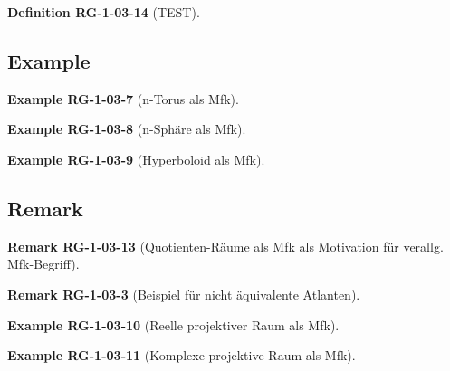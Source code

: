\documentclass[10pt, letterpaper]{article}
\newcommand{\CustomHeading}[3]{%
  \par\medskip\noindent%
  \textbf{#1 #2} \textnormal{(#3)}.\enskip%
}
\newenvironment{DEF}[2]{\CustomHeading{Definition}{#1}{#2}}{}
\newenvironment{REM}[2]{\CustomHeading{Remark}{#1}{#2}}{}
\newenvironment{EXA}[2]{\CustomHeading{Example}{#1}{#2}}{}
\begin{document}
\begin{DEF}{RG-1-03-14}{TEST}

\end{DEF}











\subsection{Example}

\begin{EXA}{RG-1-03-7}{n-Torus als Mfk}

\end{EXA}

\begin{EXA}{RG-1-03-8}{n-Sphäre als Mfk}

\end{EXA}

\begin{EXA}{RG-1-03-9}{Hyperboloid als Mfk}

\end{EXA}







\subsection{Remark}



\begin{REM}{RG-1-03-13}{Quotienten-Räume als Mfk als Motivation für verallg. Mfk-Begriff}

\end{REM}

\begin{REM}{RG-1-03-3}{Beispiel für nicht äquivalente Atlanten}

\end{REM}







\begin{EXA}{RG-1-03-10}{Reelle projektiver Raum als Mfk}

\end{EXA}

\begin{EXA}{RG-1-03-11}{Komplexe projektive Raum als Mfk}

\end{EXA}
\end{document}
